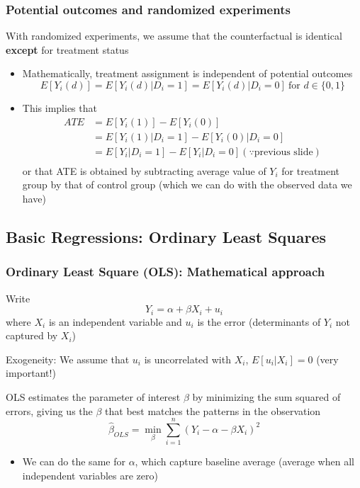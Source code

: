 \documentclass[aspectratio=169]{beamer}
\newenvironment{wideitemize}{\itemize\addtolength{\itemsep}{10pt}}{\enditemize}
\begin{document}
\begin{frame}
\frametitle{Potential outcomes and randomized experiments} 
\begin{wideitemize}

\item With randomized experiments, we assume that the counterfactual is identical \textbf{except} for treatment status
\begin{itemize}
\item Mathematically, treatment assignment is independent of potential outcomes
\[
E[Y_i(d)]=E[Y_i(d)|D_i=1]=E[Y_i(d)|D_i=0] \ \text{for } d\in\{0,1\}
\]
\item This implies that 
\[
\begin{aligned}
ATE &= E[Y_i(1)]-E[Y_i(0)]\\
&=E[Y_i(1)|D_i=1]-E[Y_i(0)|D_i=0]\\
&=E[Y_i|D_i=1]-E[Y_i|D_i=0] (\because\text{previous slide})\\
\end{aligned}
\]
or that ATE is obtained by subtracting average value of $Y_i$ for treatment group by that of control group (which we can do with the observed data we have)
\end{itemize}
\end{wideitemize}
\end{frame}

\subsection{Basic Regressions: Ordinary Least Squares}
\begin{frame}
\frametitle{Ordinary Least Square (OLS): Mathematical approach } 
\begin{wideitemize}
\item Write 
\[
Y_i = \alpha + \beta X_i + u_i 
\] 
where $X_i$ is an independent variable and $u_i$ is the error (determinants of $Y_i$ not captured by $X_i$) 
\item Exogeneity: We assume that $u_i$ is uncorrelated with $X_i$, $E[u_i|X_i]=0$ (very important!)
\item OLS estimates the parameter of interest $\beta$ by minimizing the sum squared of errors, giving us the $\beta$ that best matches the patterns in the observation
\[
\hat{\beta}_{OLS} = \min_\beta \sum_{i=1}^n (Y_i - \alpha-\beta X_i)^2
\]
\begin{itemize}
\item We can do the same for $\alpha$, which capture baseline average (average when all independent variables are zero)
\end{itemize}
\end{wideitemize}
\end{frame}
\end{document}
